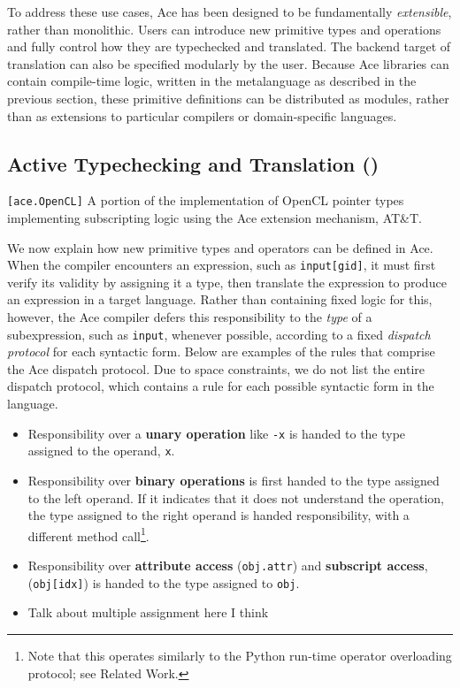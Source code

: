 \documentclass{sig-alternate}
\begin{document}
To address these use cases, Ace has been designed to be fundamentally {\em extensible}, rather than monolithic. Users can introduce new primitive types and operations and fully control how they are typechecked and translated. The backend target of translation can also be specified modularly by the user. Because Ace libraries can contain compile-time logic, written in the metalanguage as described in the previous section, these primitive definitions can be distributed as modules, rather than as extensions to particular compilers or domain-specific languages.

\subsection{Active Typechecking and Translation (\ATT)}
\begin{codelisting}

\caption{\texttt{[ace.OpenCL]} A portion of the implementation of OpenCL pointer types implementing subscripting logic using the Ace extension mechanism, AT\&T.}
\label{pointers}
\end{codelisting}
We now explain how new primitive types and operators can be defined in Ace. When the compiler encounters an expression, such as \verb|input[gid]|, it must first verify its validity by assigning it a type, then translate the expression to produce an expression in a target language. Rather than containing fixed logic for this, however, the Ace compiler defers this responsibility to the {\it type} of a subexpression, such as \verb|input|, whenever possible, according to a fixed {\em dispatch protocol} for each syntactic form. Below are examples of the rules that comprise the Ace dispatch protocol. Due to space constraints, we do not list the entire dispatch protocol, which contains a rule for each possible syntactic form in the language.
\begin{itemize}
\item Responsibility over a {\bf unary operation} like \verb|-x| is handed to the type assigned to the operand, \verb|x|.
\item Responsibility over {\bf binary operations} is first handed to the type assigned to the left operand. If it indicates that it does not understand the operation, the type assigned to the right operand is handed responsibility, with a different method call\footnote{Note that this operates similarly to the Python run-time operator overloading protocol; see Related Work.}.
\item Responsibility over {\bf attribute access} (\texttt{obj.attr}) and {\bf subscript access}, (\texttt{obj[idx]}) is handed to the type assigned to \texttt{obj}.
\item {\color{red} Talk about multiple assignment here I think}
\end{itemize}
\end{document}
